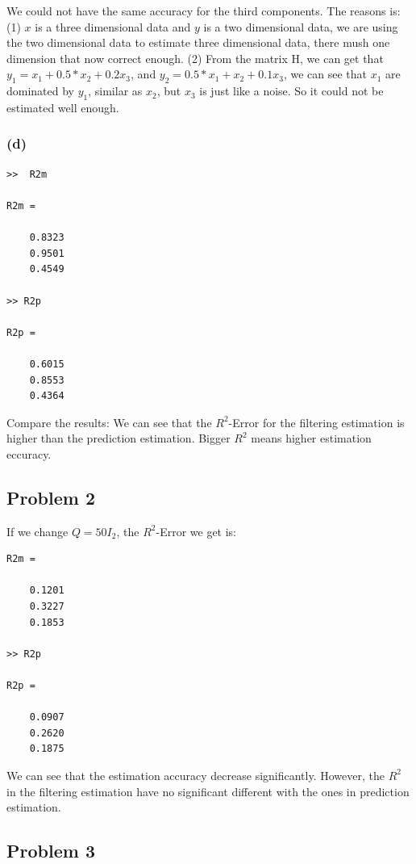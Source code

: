\documentclass[14pt,letterpaper] {article}
\begin{document}
We could not have the same accuracy for the third components. The reasons is: (1) $x$ is a three dimensional data and $y$ is a two dimensional data, 
we are using the two dimensional data to estimate three dimensional data, there mush one dimension that now correct enough. (2) From the matrix H, we can get that
$y_1=x_1+0.5*x_2+0.2x_3$, and $y_2=0.5*x_1+x_2+0.1x_3$, we can see that $x_1$ are dominated by $y_1$, similar as $x_2$, but $x_3$ is just like a noise. So it could not
be estimated well enough. 
\subsubsection{(d)}

\begin{lstlisting}
>>  R2m

R2m =

    0.8323
    0.9501
    0.4549

>> R2p

R2p =

    0.6015
    0.8553
    0.4364

\end{lstlisting}

Compare the results: We can see that the $R^2$-Error for the filtering estimation is higher than the prediction estimation.  Bigger $R^2$ means 
higher estimation eccuracy.  

\subsection{Problem 2}
If we change $Q=50I_2$, the $R^2$-Error we get is:

\begin{lstlisting}
R2m =

    0.1201
    0.3227
    0.1853

>> R2p

R2p =

    0.0907
    0.2620
    0.1875
\end{lstlisting}

We can see that the estimation accuracy decrease significantly. However, the $R^2$ in the filtering estimation have no significant different with
the ones in prediction estimation. 

\subsection{Problem 3}
\end{document}
